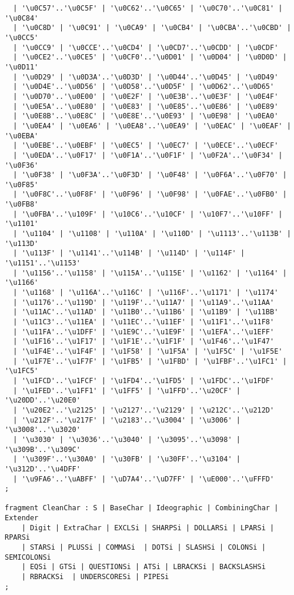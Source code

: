 \begin{verbatim}
  | '\u0C57'..'\u0C5F' | '\u0C62'..'\u0C65' | '\u0C70'..'\u0C81' | '\u0C84' 
  | '\u0C8D' | '\u0C91' | '\u0CA9' | '\u0CB4' | '\u0CBA'..'\u0CBD' | '\u0CC5'
  | '\u0CC9' | '\u0CCE'..'\u0CD4' | '\u0CD7'..'\u0CDD' | '\u0CDF' 
  | '\u0CE2'..'\u0CE5' | '\u0CF0'..'\u0D01' | '\u0D04' | '\u0D0D' | '\u0D11' 
  | '\u0D29' | '\u0D3A'..'\u0D3D' | '\u0D44'..'\u0D45' | '\u0D49' 
  | '\u0D4E'..'\u0D56' | '\u0D58'..'\u0D5F' | '\u0D62'..'\u0D65' 
  | '\u0D70'..'\u0E00' | '\u0E2F' | '\u0E3B'..'\u0E3F' | '\u0E4F' 
  | '\u0E5A'..'\u0E80' | '\u0E83' | '\u0E85'..'\u0E86' | '\u0E89' 
  | '\u0E8B'..'\u0E8C' | '\u0E8E'..'\u0E93' | '\u0E98' | '\u0EA0' 
  | '\u0EA4' | '\u0EA6' | '\u0EA8'..'\u0EA9' | '\u0EAC' | '\u0EAF' | '\u0EBA' 
  | '\u0EBE'..'\u0EBF' | '\u0EC5' | '\u0EC7' | '\u0ECE'..'\u0ECF' 
  | '\u0EDA'..'\u0F17' | '\u0F1A'..'\u0F1F' | '\u0F2A'..'\u0F34' | '\u0F36' 
  | '\u0F38' | '\u0F3A'..'\u0F3D' | '\u0F48' | '\u0F6A'..'\u0F70' | '\u0F85' 
  | '\u0F8C'..'\u0F8F' | '\u0F96' | '\u0F98' | '\u0FAE'..'\u0FB0' | '\u0FB8' 
  | '\u0FBA'..'\u109F' | '\u10C6'..'\u10CF' | '\u10F7'..'\u10FF' | '\u1101' 
  | '\u1104' | '\u1108' | '\u110A' | '\u110D' | '\u1113'..'\u113B' | '\u113D' 
  | '\u113F' | '\u1141'..'\u114B' | '\u114D' | '\u114F' | '\u1151'..'\u1153' 
  | '\u1156'..'\u1158' | '\u115A'..'\u115E' | '\u1162' | '\u1164' | '\u1166' 
  | '\u1168' | '\u116A'..'\u116C' | '\u116F'..'\u1171' | '\u1174' 
  | '\u1176'..'\u119D' | '\u119F'..'\u11A7' | '\u11A9'..'\u11AA' 
  | '\u11AC'..'\u11AD' | '\u11B0'..'\u11B6' | '\u11B9' | '\u11BB' 
  | '\u11C3'..'\u11EA' | '\u11EC'..'\u11EF' | '\u11F1'..'\u11F8' 
  | '\u11FA'..'\u1DFF' | '\u1E9C'..'\u1E9F' | '\u1EFA'..'\u1EFF' 
  | '\u1F16'..'\u1F17' | '\u1F1E'..'\u1F1F' | '\u1F46'..'\u1F47' 
  | '\u1F4E'..'\u1F4F' | '\u1F58' | '\u1F5A' | '\u1F5C' | '\u1F5E' 
  | '\u1F7E'..'\u1F7F' | '\u1FB5' | '\u1FBD' | '\u1FBF'..'\u1FC1' | '\u1FC5' 
  | '\u1FCD'..'\u1FCF' | '\u1FD4'..'\u1FD5' | '\u1FDC'..'\u1FDF' 
  | '\u1FED'..'\u1FF1' | '\u1FF5' | '\u1FFD'..'\u20CF' | '\u20DD'..'\u20E0' 
  | '\u20E2'..'\u2125' | '\u2127'..'\u2129' | '\u212C'..'\u212D' 
  | '\u212F'..'\u217F' | '\u2183'..'\u3004' | '\u3006' | '\u3008'..'\u3020'
  | '\u3030' | '\u3036'..'\u3040' | '\u3095'..'\u3098' | '\u309B'..'\u309C' 
  | '\u309F'..'\u30A0' | '\u30FB' | '\u30FF'..'\u3104' | '\u312D'..'\u4DFF' 
  | '\u9FA6'..'\uABFF' | '\uD7A4'..'\uD7FF' | '\uE000'..'\uFFFD'
;

fragment CleanChar : S | BaseChar | Ideographic | CombiningChar | Extender 
    | Digit | ExtraChar | EXCLSi | SHARPSi | DOLLARSi | LPARSi | RPARSi 
    | STARSi | PLUSSi | COMMASi  | DOTSi | SLASHSi | COLONSi | SEMICOLONSi 
    | EQSi | GTSi | QUESTIONSi | ATSi | LBRACKSi | BACKSLASHSi 
    | RBRACKSi  | UNDERSCORESi | PIPESi
;


\end{verbatim}
